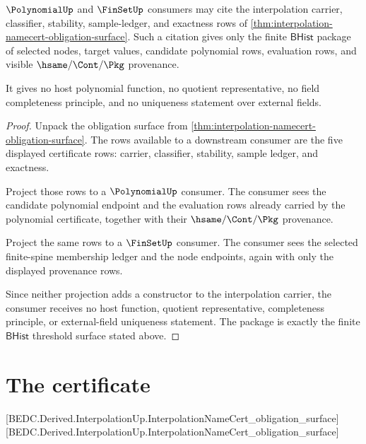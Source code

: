 \begin{theorem}
\label{thm:interpolation-downstream-threshold-package}
$\PolynomialUp$ and $\FinSetUp$ consumers may cite the interpolation carrier,
classifier, stability, sample-ledger, and exactness rows of
\autoref{thm:interpolation-namecert-obligation-surface}. Such a citation gives
only the finite $\mathsf{BHist}$ package of selected nodes, target values,
candidate polynomial rows, evaluation rows, and visible $\hsame/\Cont/\Pkg$
provenance.

It gives no host polynomial function, no quotient representative, no field
completeness principle, and no uniqueness statement over external fields.
\end{theorem}
\begin{proof}
Unpack the obligation surface from
\autoref{thm:interpolation-namecert-obligation-surface}. The rows available to
a downstream consumer are the five displayed certificate rows: carrier,
classifier, stability, sample ledger, and exactness.

Project those rows to a $\PolynomialUp$ consumer. The consumer sees the
candidate polynomial endpoint and the evaluation rows already carried by the
polynomial certificate, together with their $\hsame/\Cont/\Pkg$ provenance.

Project the same rows to a $\FinSetUp$ consumer. The consumer sees the
selected finite-spine membership ledger and the node endpoints, again with only
the displayed provenance rows.

Since neither projection adds a constructor to the interpolation carrier, the
consumer receives no host function, quotient representative, completeness
principle, or external-field uniqueness statement. The package is exactly the
finite $\mathsf{BHist}$ threshold surface stated above.
\end{proof}

\section{The certificate}
\label{sec:interpolation-certificate}

[BEDC.Derived.InterpolationUp.InterpolationNameCert\_obligation\_surface]
[BEDC.Derived.InterpolationUp.InterpolationNameCert\_obligation\_surface]

